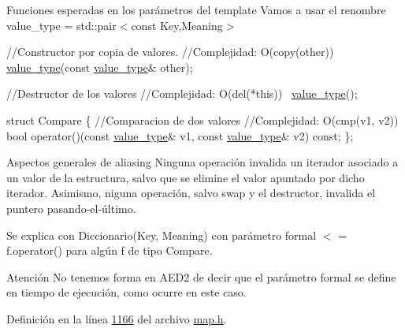 \begin{DoxyParagraph}{Funciones esperadas en los parámetros del template}
Vamos a usar el renombre value\+\_\+type = std\+::pair$<$const Key,\+Meaning$>$


\begin{DoxyCode}
\textcolor{comment}{//Constructor por copia de valores.}
\textcolor{comment}{//Complejidad: O(copy(other))}
\hyperlink{classaed2_1_1map_a719db98e0ff9a837610f76be33264680_a719db98e0ff9a837610f76be33264680}{value\_type}(\textcolor{keyword}{const} \hyperlink{classaed2_1_1map_a719db98e0ff9a837610f76be33264680_a719db98e0ff9a837610f76be33264680}{value\_type}& other);

\textcolor{comment}{//Destructor de los valores}
\textcolor{comment}{//Complejidad: O(del(*this))}
~\hyperlink{classaed2_1_1map_a719db98e0ff9a837610f76be33264680_a719db98e0ff9a837610f76be33264680}{value\_type}();

\textcolor{keyword}{struct }Compare \{
  \textcolor{comment}{//Comparacion de dos valores}
  \textcolor{comment}{//Complejidad: O(cmp(v1, v2))}
  \textcolor{keywordtype}{bool} operator()(\textcolor{keyword}{const} \hyperlink{classaed2_1_1map_a719db98e0ff9a837610f76be33264680_a719db98e0ff9a837610f76be33264680}{value\_type}& v1, \textcolor{keyword}{const} \hyperlink{classaed2_1_1map_a719db98e0ff9a837610f76be33264680_a719db98e0ff9a837610f76be33264680}{value\_type}& v2) \textcolor{keyword}{const};
\};
\end{DoxyCode}
 
\end{DoxyParagraph}


\begin{DoxyParagraph}{Aspectos generales de aliasing}
Ninguna operación invalida un iterador asociado a un valor de la estructura, salvo que se elimine el valor apuntado por dicho iterador. Asimismo, niguna operación, salvo swap y el destructor, invalida el puntero pasando-\/el-\/último.
\end{DoxyParagraph}
\begin{DoxyParagraph}{Se explica con}
Diccionario(Key, Meaning) con parámetro formal $<$ = f.\+operator() para algún f de tipo Compare.
\end{DoxyParagraph}
\begin{DoxyAttention}{Atención}
No tenemos forma en A\+E\+D2 de decir que el parámetro formal se define en tiempo de ejecución, como ocurre en este caso. 
\end{DoxyAttention}


Definición en la línea \hyperlink{map_8h_source_l01166}{1166} del archivo \hyperlink{map_8h_source}{map.\+h}.



